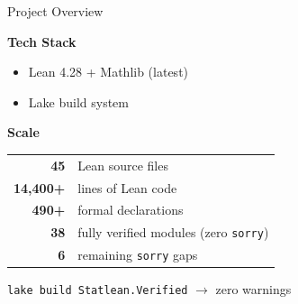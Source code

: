 \documentclass[aspectratio=169, 10pt]{beamer}
\begin{document}
\begin{frame}{Project Overview}

\textbf{Tech Stack}
\begin{itemize}
  \item Lean 4.28 + Mathlib (latest)
  \item Lake build system
\end{itemize}

\vspace{0.8em}
\textbf{Scale}
\begin{center}
\begin{tabular}{rl}
  \toprule
  \textbf{45} & Lean source files \\
  \textbf{14,400+} & lines of Lean code \\
  \textbf{490+} & formal declarations \\
  \textbf{38} & fully verified modules (zero \texttt{sorry}) \\
  \textbf{6} & remaining \texttt{sorry} gaps \\
  \bottomrule
\end{tabular}
\end{center}

\vspace{0.3em}
{\small\color{statgreen} \texttt{lake build Statlean.Verified} $\to$ zero warnings}

\end{frame}
\end{document}

